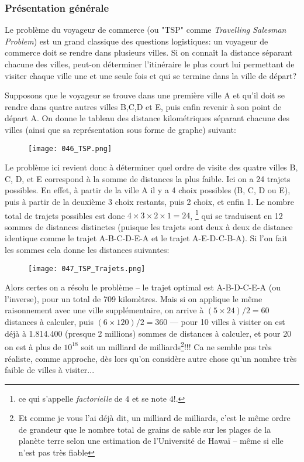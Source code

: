 \documentclass[12pt]{article}
\begin{document}
	\subsubsection*{Présentation générale}
	Le problème du voyageur de commerce (ou "TSP" comme \textit{Travelling Salesman Problem}) est un grand classique des questions logistiques: un voyageur de commerce doit se rendre dans plusieurs villes. Si on connaît la distance séparant chacune des villes, peut-on déterminer l'itinéraire le plus court lui permettant de visiter chaque ville une et une seule fois et qui se termine dans la ville de départ?
	
	Supposons que le voyageur se trouve dans une première ville A et qu'il doit se rendre dans quatre autres villes B,C,D et E, puis enfin revenir à son point de départ A. On donne le tableau des distance kilométriques séparant chacune des villes (ainsi que sa représentation sous forme de graphe) suivant:
	\begin{figure}[H]
		\centering
		\texttt{[image: 046\_TSP.png]}
	\end{figure}
	
	Le problème ici revient donc à déterminer quel ordre de visite des quatre villes B, C, D, et E correspond à la somme de distances la plus faible. Ici on a 24 trajets possibles. En effet, à partir de la ville A il y a 4 choix possibles (B, C, D ou E), puis à partir de la deuxième 3 choix restants, puis 2 choix, et enfin 1. Le nombre total de trajets possibles est donc $4 \times 3 \times 2 \times 1 = 24$, \footnote{ce qui s'appelle \textit{factorielle} de $4$ et se note $4!$.} qui se traduisent en 12 sommes de distances distinctes (puisque les trajets sont deux à deux de distance identique comme le trajet A-B-C-D-E-A et le trajet A-E-D-C-B-A). Si l'on fait les sommes cela donne les distances suivantes:
	\begin{figure}[H]
		\centering
		\texttt{[image: 047\_TSP\_Trajets.png]}
	\end{figure}
	
	Alors certes on a résolu le problème -- le trajet optimal est A-B-D-C-E-A (ou l'inverse), pour un total de 709 kilomètres. Mais si on applique le même raisonnement avec une ville supplémentaire, on arrive à $(5 \times 24) / 2 = 60$ distances à calculer, puis $(6 \times 120) / 2 = 360$ --- pour 10 villes à visiter on est déjà à 1.814.400 (presque 2 millions) sommes de distances à calculer, et pour 20 on est à plus de $10^{18}$ soit un milliard de milliards\footnote{Et comme je vous l'ai déjà dit, un milliard de milliards, c'est le même ordre de grandeur que le nombre total de grains de sable sur les plages de la planète terre selon une estimation de l'Université de Hawaï -- même si elle n'est pas très fiable}!!! Ca ne semble pas très réaliste, comme approche, dès lors qu'on considère autre chose qu'un nombre très faible de villes à visiter...
	
\end{document}
